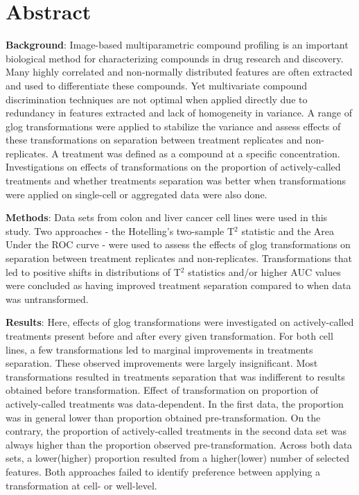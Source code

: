 \documentclass[11pt]{article}
\begin{document}
\section*{Abstract}
\par{\textbf{Background}: Image-based multiparametric compound profiling is an important biological method for characterizing compounds in drug research and discovery. Many highly correlated and non-normally distributed features are often extracted and used to differentiate these compounds. Yet multivariate compound discrimination techniques are not optimal when applied directly due to redundancy in features extracted and lack of homogeneity in variance. A range of glog transformations were applied to stabilize the variance and assess effects of these transformations on separation between treatment replicates and non-replicates. A treatment was defined as a compound at a specific concentration. Investigations on effects of transformations on the proportion of actively-called treatments and whether treatments separation was better when transformations were applied on single-cell or aggregated data were also done.} 
\par{\textbf{Methods}: Data sets from colon and liver cancer cell lines were used in this study. Two approaches - the Hotelling's two-sample T$^2$ statistic and the Area Under the ROC curve - were used to assess the effects of glog transformations on separation between treatment replicates and non-replicates. Transformations that led to positive shifts in distributions of T$^2$ statistics and/or higher AUC values were concluded as having improved treatment separation compared to when data was untransformed. }
\par{\textbf{Results}: Here, effects of glog transformations were investigated on actively-called treatments present before and after every given transformation. For both cell lines, a few transformations led to marginal improvements in treatments separation. These observed improvements were largely insignificant. Most transformations resulted in treatments separation that was indifferent to results obtained before transformation. Effect of transformation on proportion of actively-called treatments was data-dependent. In the first data, the proportion was in general lower than proportion obtained pre-transformation. On the contrary, the proportion of actively-called treatments in the second data set was always higher than the proportion observed pre-transformation. Across both data sets, a lower(higher) proportion resulted from a higher(lower) number of selected features. Both approaches failed to identify preference between applying a transformation at cell- or well-level.}
\end{document}
